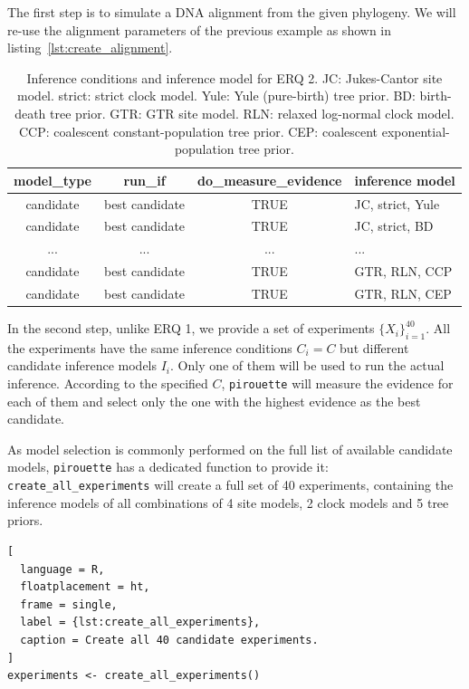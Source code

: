 \documentclass{article}
\begin{document}
The first step is to simulate a DNA alignment from the 
given phylogeny. 
We will re-use the alignment parameters of the previous example 
as shown in listing~\ref{lst:create_alignment}.

\begin{table}
  \begin{tabular}{ | c | c | c | l | }
    \hline
    \textbf{model\_type} &
    \textbf{run\_if} & \textbf{do\_measure\_evidence} & 
    \textbf{inference model} \\ 
    \hline
    candidate & best candidate & TRUE & JC, strict, Yule \\
    candidate & best candidate & TRUE & JC, strict, BD   \\
    ...       & ...            & ... & ...              \\
    candidate & best candidate & TRUE & GTR, RLN, CCP    \\
    candidate & best candidate & TRUE & GTR, RLN, CEP    \\
    \hline
  \end{tabular}
  \caption{
    Inference conditions and inference model for ERQ 2.
    JC: Jukes-Cantor site model.
    strict: strict clock model.
    Yule: Yule (pure-birth) tree prior.
    BD: birth-death tree prior.
    GTR: GTR site model.
    RLN: relaxed log-normal clock model.
    CCP: coalescent constant-population tree prior.
    CEP: coalescent exponential-population tree prior.
  }
  \label{tab:RQ2}
\end{table}

In the second step, unlike ERQ 1, we provide a 
set of experiments $\{\mathit{X_{i}}\}_{i=1}^{40}$. All the experiments have 
the same inference conditions $\mathit{C_{i}} = \mathit{C}$ but different 
candidate inference models $\mathit{I_{i}}$. Only one of them will be used 
to run the actual inference. According to the specified $\mathit{C}$, 
\verb;pirouette; will measure the evidence for each of them and select only 
the one with the highest evidence as the best candidate.

As model selection is commonly performed on the full list of available 
candidate models, \verb;pirouette; has a dedicated function to provide it:
\verb;create_all_experiments; will create a full set of 40 experiments,
containing the inference models of all combinations of 
4 site models, 2 clock models and 5 tree priors.

\begin{lstlisting}[
  language = R, 
  floatplacement = ht, 
  frame = single, 
  label = {lst:create_all_experiments},
  caption = Create all 40 candidate experiments.
]
experiments <- create_all_experiments()
\end{lstlisting}
\end{document}
